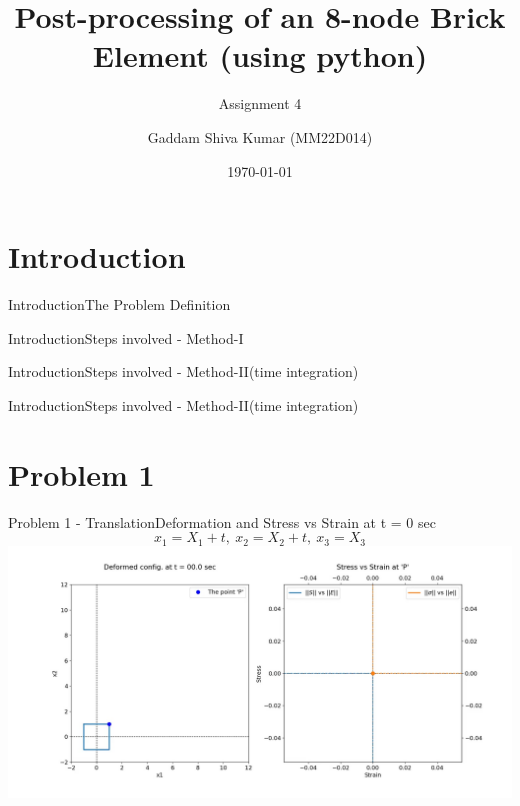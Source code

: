 \documentclass{beamer}
\title[Post-processing of an 8-node Brick Element]{Post-processing of an 8-node Brick Element \small{(using python)}}
\subtitle{Assignment 4}
\author[Gaddam Shiva Kumar]{Gaddam Shiva Kumar (MM22D014)}
\institute[]{ME7227 : Nonlinear Finite Element Analysis of Solid Continua}
\date{\today}
\begin{document}
\begin{frame}
\maketitle
\end{frame}



\section{Introduction}


\begin{frame}{Introduction}{The Problem Definition}
    
\end{frame}

\begin{frame}{Introduction}{Steps involved - Method-I}
    
\end{frame}

\begin{frame}{Introduction}{Steps involved - Method-II(time integration)}
    
\end{frame}

\begin{frame}{Introduction}{Steps involved - Method-II(time integration)}
    
\end{frame}

\section{Problem 1}

\begin{frame}{Problem 1 - Translation}{Deformation and Stress vs Strain at t = 0 sec}
    \vspace{-1em}
    \scriptsize $$x_1 = X_1+t,\ x_2 = X_2+t,\ x_3 = X_3$$
    \includegraphics[width=\textwidth, trim={4.5cm 2cm 3cm 1cm}, clip]{Plots/itranslation.jpg}
\end{frame}
\end{document}

